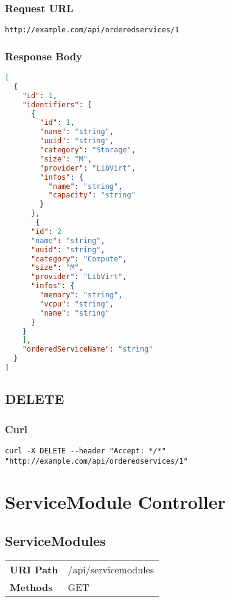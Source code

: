 \subsubsection{Request URL}
\begin{lstlisting}[] 
http://example.com/api/orderedservices/1
\end{lstlisting}

\subsubsection{Response Body}
\begin{lstlisting}[language=json] 
[
  {
    "id": 1,
    "identifiers": [
      {
        "id": 1,
        "name": "string",
        "uuid": "string",
        "category": "Storage",
        "size": "M",
        "provider": "LibVirt",
        "infos": {
          "name": "string",
          "capacity": "string"
        }
      },
       {
      "id": 2
      "name": "string",
      "uuid": "string",
      "category": "Compute",
      "size": "M",
      "provider": "LibVirt",
      "infos": {
        "memory": "string",
        "vcpu": "string",
        "name": "string"
      }
    }
    ],
    "orderedServiceName": "string"
  }
]
\end{lstlisting}


\subsection{DELETE}
\subsubsection{Curl}
\begin{lstlisting}[] 
curl -X DELETE --header "Accept: */*" "http://example.com/api/orderedservices/1"
\end{lstlisting}

\section{ServiceModule Controller}
\subsection{ServiceModules}
\begin{tabularx}{\linewidth}{l l}
\textbf{URI Path} & /api/servicemodules\\
\textbf{Methods} & GET\\
\end{tabularx}

